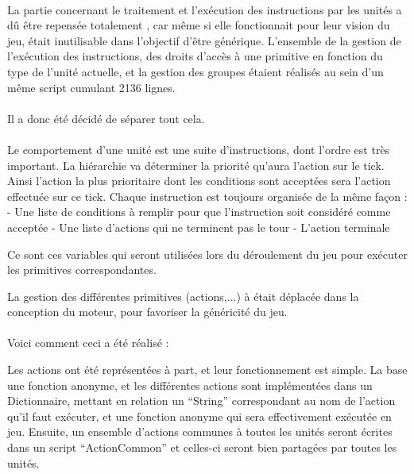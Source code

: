 \documentclass{report}
\begin{document}
\paragraph{}
La partie concernant le traitement et l'exécution des instructions par les unités a dû être repensée totalement , car même si elle fonctionnait pour leur vision du jeu, était inutilisable dans l’objectif d’être générique. 
L’ensemble de la gestion de l'exécution des instructions, des droits d’accès à une primitive en fonction du type de l’unité actuelle, et la gestion des groupes étaient réalisés au sein d’un même script cumulant 2136 lignes.
\paragraph{}
Il a donc été décidé de séparer tout cela.
\paragraph{}
Le comportement d'une unité est une suite d'instructions, dont l'ordre est très important. La hiérarchie va déterminer la priorité qu'aura l'action sur le tick. Ainsi l'action la plus prioritaire dont les conditions sont acceptées sera l'action effectuée sur ce tick.
Chaque instruction est toujours organisée de la même façon :
- Une liste de conditions à remplir pour que l'instruction soit considéré comme acceptée\newline
- Une liste d'actions qui ne terminent pas le tour\newline
- L'action terminale\newline

Ce sont ces variables qui seront utilisées lors du déroulement du jeu pour exécuter les primitives correspondantes.

La gestion des différentes primitives (actions,...) à était déplacée dans la conception du moteur, pour favoriser la généricité du jeu.
\paragraph{}
Voici comment ceci a été réalisé : 

Les actions ont été représentées à part, et leur fonctionnement est simple. La base une fonction anonyme, et les différentes actions sont implémentées dans un Dictionnaire, mettant en relation un “String” correspondant au nom de l’action qu’il faut exécuter, et une fonction anonyme qui sera effectivement exécutée en jeu. Ensuite, un ensemble d’actions communes à toutes les unités seront écrites dans un script “ActionCommon” et celles-ci seront bien partagées par toutes les unités. 
\end{document}
